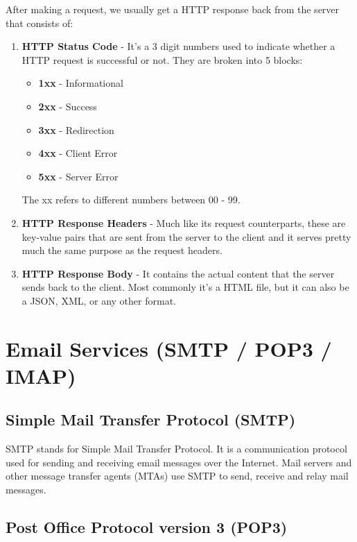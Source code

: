 \documentclass[12pt,titlepage]{article}
\begin{document}
After making a request, we usually get a HTTP response back from the server that consists of:
\begin{enumerate}
    \item {
        \textbf{HTTP Status Code} - It's a 3 digit numbers used to indicate whether a HTTP request
        is successful or not. They are broken into 5 blocks:
        \begin{itemize}
            \item \textbf{1xx} - Informational
            \item \textbf{2xx} - Success
            \item \textbf{3xx} - Redirection
            \item \textbf{4xx} - Client Error
            \item \textbf{5xx} - Server Error
        \end{itemize}
        The xx refers to different numbers between 00 - 99.
    }
    \item {
        \textbf{HTTP Response Headers} - Much like its request counterparts, these are key-value pairs that are
        sent from the server to the client and it serves pretty much the same purpose as the request headers.
    }
    \item {
        \textbf{HTTP Response Body} - It contains the actual content that the server sends back to the client.
        Most commonly it's a HTML file, but it can also be a JSON, XML, or any other format.
    }
\end{enumerate}

\section{Email Services (SMTP / POP3 / IMAP)}

\subsection{Simple Mail Transfer Protocol (SMTP)}

SMTP stands for Simple Mail Transfer Protocol. It is a communication protocol used for sending
and receiving email messages over the Internet. Mail servers and other message transfer agents (MTAs)
use SMTP to send, receive and relay mail messages.

\subsection{Post Office Protocol version 3 (POP3)}
\end{document}
